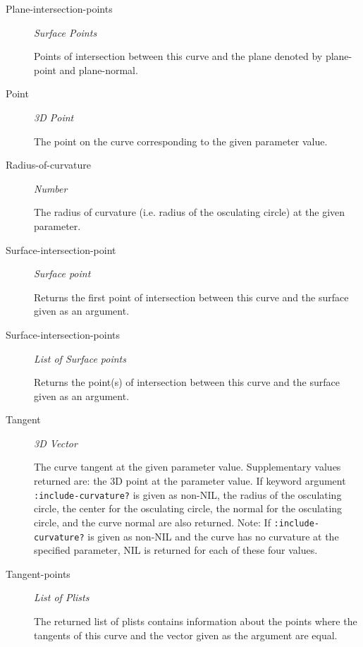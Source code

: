\documentclass [11pt]{book}
\begin{document}
\begin{itemize}
\begin{description}
\item [Plane-intersection-points]
\emph{Surface Points}

  Points of intersection between this curve and the plane denoted by plane-point and plane-normal.




\item [Point]
\emph{3D Point}

 The point on the curve corresponding to the given parameter value.




\item [Radius-of-curvature]
\emph{Number}

 The radius of curvature (i.e. radius of the osculating circle) at the given parameter.




\item [Surface-intersection-point]
\emph{Surface point}

 Returns the first point of intersection between this curve and the surface given as an argument.




\item [Surface-intersection-points]
\emph{List of Surface points}

 Returns the point(s) of intersection between this curve and the surface given as an argument.




\item [Tangent]
\emph{3D Vector}

 The curve tangent at the given parameter value. Supplementary values returned
are: the 3D point at the parameter value. If keyword argument \texttt{:include-curvature?} is given as non-NIL,
the radius of the osculating circle, the center for the osculating circle, the normal for the osculating circle,
and the curve normal are also returned. Note: If \texttt{:include-curvature?} is given as non-NIL and the curve
has no curvature at the specified parameter, NIL is returned for each of these four values.




\item [Tangent-points]
\emph{List of Plists}

 The returned list of plists contains information about the points where the tangents of this curve and the vector given as the argument
are equal.





\end{description}
\end{itemize}
\end{document}
